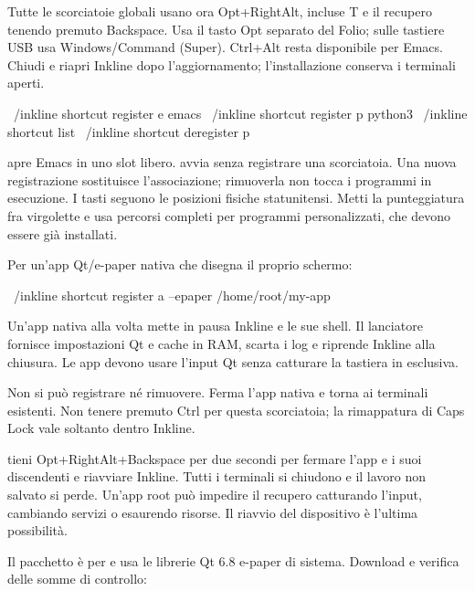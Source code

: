 Tutte le scorciatoie globali usano ora Opt+RightAlt, incluse T e il recupero tenendo premuto Backspace. Usa il tasto Opt separato del Folio; sulle tastiere USB usa Windows/Command (Super). Ctrl+Alt resta disponibile per Emacs. Chiudi e riapri Inkline dopo l’aggiornamento; l’installazione conserva i terminali aperti.

\begin{shell}
~/inkline shortcut register e emacs
~/inkline shortcut register p python3
~/inkline shortcut list
~/inkline shortcut deregister p
\end{shell}

 apre Emacs in uno slot libero.
 avvia senza registrare una scorciatoia.
Una nuova registrazione sostituisce l'associazione; rimuoverla non tocca i
programmi in esecuzione. I tasti seguono le posizioni fisiche statunitensi.
Metti la punteggiatura fra virgolette e usa percorsi completi per programmi
personalizzati, che devono essere già installati.

Per un'app Qt/e-paper nativa che disegna il proprio schermo:
\begin{shell}
~/inkline shortcut register a --epaper /home/root/my-app
\end{shell}
Un'app nativa alla volta mette in pausa Inkline e le sue shell. Il lanciatore
fornisce impostazioni Qt e cache in RAM, scarta i log e riprende Inkline alla
chiusura. Le app devono usare l'input Qt senza catturare la tastiera in esclusiva.

\begin{notice}
 Non si può registrare né rimuovere.
Ferma l'app nativa e torna ai terminali esistenti. Non tenere premuto Ctrl per questa scorciatoia;
la rimappatura di Caps Lock vale soltanto dentro Inkline.
\end{notice}

 tieni Opt+RightAlt+Backspace per due secondi per fermare l'app
e i suoi discendenti e riavviare Inkline. Tutti i terminali si chiudono e il
lavoro non salvato si perde. Un'app root può impedire il recupero catturando
l'input, cambiando servizi o esaurendo risorse. Il riavvio del dispositivo è
l'ultima possibilità.

Il pacchetto è per  e usa le librerie
Qt 6.8 e-paper di sistema. Download e verifica delle somme di controllo:

\InstallLink

